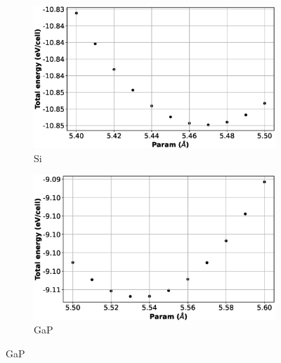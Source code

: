 \begin{figure}[htb]
\begin{subfigure}{0.45\textwidth}
  \includegraphics[width=\linewidth]{images/si_3d_opt.eps}
  \caption{Si}
\end{subfigure}\hfil %
\begin{subfigure}{0.45\textwidth}
  \includegraphics[width=\linewidth]{images/gap_3d_opt.eps}
  \caption{GaP}
\end{subfigure}\hfil %

\medskip


\end{figure}
